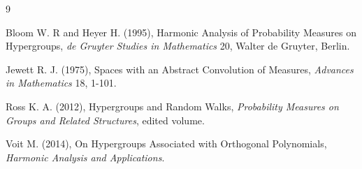 \documentclass[twoside]{article}
\begin{document}
\begin{thebibliography}{9}

Bloom W. R and Heyer H. (1995), Harmonic Analysis of Probability Measures on Hypergroups, {\it de Gruyter Studies in Mathematics} 20, Walter de Gruyter, Berlin. 


Jewett R. J. (1975), Spaces with an Abstract Convolution of Measures, {\it Advances in Mathematics} 18, 1-101. 


Ross K. A. (2012), Hypergroups and Random Walks, {\it Probability Measures on Groups and Related Structures}, edited volume.

 Voit M. (2014), On Hypergroups Associated with Orthogonal Polynomials, {\it Harmonic Analysis and Applications}. 

\end{thebibliography}
 
\end{document}
